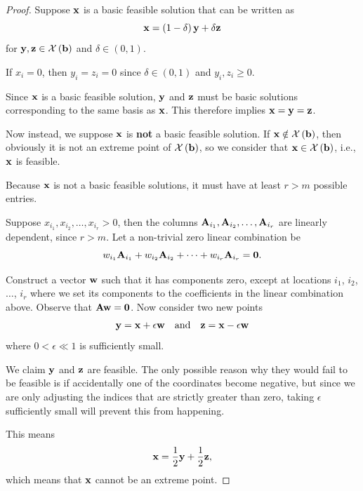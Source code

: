 \documentclass[11pt]{article}
\theoremstyle{definition}
\theoremstyle{remark}
\newcommand{\pqty}[1]{\left(#1\right)}
\newcommand{\oointv}[2]{(#1,#2)}
\newcommand{\qand}{\quad\text{and}\quad}
\begin{document}
\begin{proof}
    Suppose \(\vb{x}\) is a basic feasible solution that can be written as
    \[
        \vb{x} = \pqty{1 - \delta} \vb{y} + \delta \vb{z}
    \]
    for \(\vb{y}, \vb{z} \in \mathcal{X} \pqty{\vb{b}}\) and \(\delta \in \oointv{0}{1}\).

    If \(x_i = 0\), then \(y_i = z_i = 0\) since \(\delta \in \oointv{0}{1}\) and \(y_i, z_i \geq 0\).

    Since \(\vb{x}\) is a basic feasible solution, \(\vb{y}\) and \(\vb{z}\) must be basic solutions corresponding to the same basis as \(\vb{x}\). This therefore implies \(\vb{x} = \vb{y} = \vb{z}\).

    Now instead, we suppose \(\vb{x}\) is \textbf{not} a basic feasible solution. If \(\vb{x} \notin \mathcal{X} \pqty{\vb{b}}\), then obviously it is not an extreme point of \(\mathcal{X} \pqty{\vb{b}}\), so we consider that \(\vb{x} \in \mathcal{X} \pqty{\vb{b}}\), i.e., \(\vb{x}\) is feasible.

    Because \(\vb{x}\) is not a basic feasible solutions, it must have at least \(r > m\) possible entries.
    
    Suppose \(x_{i_1}, x_{i_2}, \ldots, x_{i_r} > 0\), then the columns \(\vb{A}_{i_1}, \vb{A}_{i_2}, \ldots, \vb{A}_{i_r}\) are linearly dependent, since \(r > m\). Let a non-trivial zero linear combination be
    \[
        w_{i_1} \vb{A}_{i_1} + w_{i_2} \vb{A}_{i_2} + \cdots + w_{i_r} \vb{A}_{i_r} = \vb{0}.
    \]

    Construct a vector \(\vb{w}\) such that it has components zero, except at locations \(i_1\), \(i_2\), \(\ldots\), \(i_r\) where we set its components to the coefficients in the linear combination above. Observe that \(\vb{Aw} = \vb{0}\). Now consider two new points
    \[
        \vb{y} = \vb{x} + \epsilon \vb{w} \qand \vb{z} = \vb{x} - \epsilon \vb{w}
    \]
    where \(0 < \epsilon \ll 1\) is sufficiently small.
    
    We claim \(\vb{y}\) and \(\vb{z}\) are feasible. The only possible reason why they would fail to be feasible is if accidentally one of the coordinates become negative, but since we are only adjusting the indices that are strictly greater than zero, taking \(\epsilon\) sufficiently small will prevent this from happening.

    This means
    \[
        \vb{x} = \frac{1}{2} \vb{y} + \frac{1}{2} \vb{z},
    \]
    which means that \(\vb{x}\) cannot be an extreme point.
\end{proof}
\end{document}
